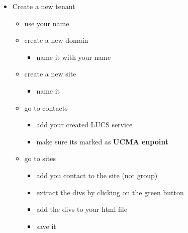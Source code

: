 \documentclass{article}
\begin{document}
\begin{itemize}[noitemsep,topsep=\mdcompacttopsep]%

\item{}Create a new tenant 

\begin{itemize}[noitemsep,topsep=\mdcompacttopsep]%

\item{}use your name%

\item{}create a new domain 

\begin{itemize}[noitemsep,topsep=\mdcompacttopsep]%

\item{}name it with your name%
\end{itemize}%

\item{}create a new site 

\begin{itemize}[noitemsep,topsep=\mdcompacttopsep]%

\item{}name it%
\end{itemize}%

\item{}go to contacts

\begin{itemize}[noitemsep,topsep=\mdcompacttopsep]%

\item{}add your created LUCS service%

\item{}make sure its marked as \textbf{UCMA enpoint}%
\end{itemize}%

\item{}go to sites

\begin{itemize}[noitemsep,topsep=\mdcompacttopsep]%

\item{}add you contact to the site (not group)%

\item{}extract the divs by clicking on the green button%

\item{}add the divs to your html file%

\item{}save it%
\end{itemize}%
\end{itemize}%
\end{itemize}%
\end{document}
